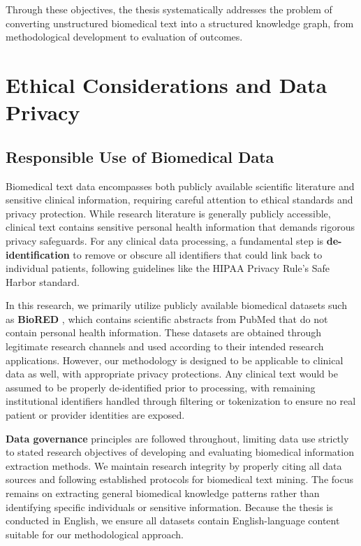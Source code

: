 Through these objectives, the thesis systematically addresses the problem of converting unstructured biomedical text into a structured knowledge graph, from methodological development to evaluation of outcomes.


\section{Ethical Considerations and Data Privacy}

\subsection{Responsible Use of Biomedical Data}

Biomedical text data encompasses both publicly available scientific literature and sensitive clinical information, requiring careful attention to ethical standards and privacy protection. While research literature is generally publicly accessible, clinical text contains sensitive personal health information that demands rigorous privacy safeguards. For any clinical data processing, a fundamental step is \textbf{de-identification} to remove or obscure all identifiers that could link back to individual patients, following guidelines like the HIPAA Privacy Rule's Safe Harbor standard.

In this research, we primarily utilize publicly available biomedical datasets such as \textbf{BioRED} \parencite{BioRED}, which contains scientific abstracts from PubMed that do not contain personal health information. These datasets are obtained through legitimate research channels and used according to their intended research applications. However, our methodology is designed to be applicable to clinical data as well, with appropriate privacy protections. Any clinical text would be assumed to be properly de-identified prior to processing, with remaining institutional identifiers handled through filtering or tokenization to ensure no real patient or provider identities are exposed.

\textbf{Data governance} principles are followed throughout, limiting data use strictly to stated research objectives of developing and evaluating biomedical information extraction methods. We maintain research integrity by properly citing all data sources and following established protocols for biomedical text mining. The focus remains on extracting general biomedical knowledge patterns rather than identifying specific individuals or sensitive information. Because the thesis is conducted in English, we ensure all datasets contain English-language content suitable for our methodological approach.

